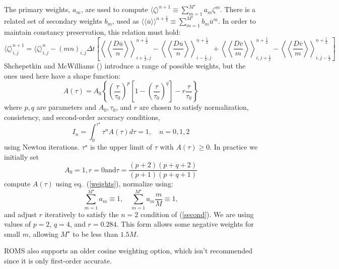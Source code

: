 The primary weights, $a_m$, are used to compute $\langle \zeta
\rangle^{n+1} \equiv \sum_{m=1}^{M^\star} a_m \zeta^m$. There is a
related set of secondary weights $b_m$, used as $\langle \! \langle
\overline{u} \rangle \! \rangle^{n+\frac{1}{2}} \equiv \sum_{m=1}^{M^\star} b_m
\overline{u}^m$. In order to maintain constancy preservation, this
relation must hold:
\begin{equation}
  \langle \zeta \rangle_{i,j}^{n+1} = \langle \zeta \rangle_{i,j}^n -
  (mn)_{i,j} \Delta t \left[ \left\langle \!\! \left\langle
  \frac{D\overline u}{n} \right\rangle \!\!
  \right\rangle_{i+\frac{1}{2},j}^{n+\frac{1}{2}}
  - \left\langle \!\! \left\langle \frac{D\overline u}{n} \right\rangle
  \!\! \right\rangle_{i-\frac{1}{2},j}^{n+\frac{1}{2}} +
  \left\langle \!\! \left\langle
  \frac{D\overline v}{m} \right\rangle \!\!
  \right\rangle_{i,j+\frac{1}{2}}^{n+\frac{1}{2}}
  - \left\langle \!\! \left\langle \frac{D\overline v}{m} \right\rangle
  \!\! \right\rangle_{i,j-\frac{1}{2}}^{n+\frac{1}{2}} \right]
\label{zeta3}
\end{equation}
Shchepetkin and McWilliams (\cite{SS2005}) introduce a range of
possible weights, but the ones used here have a shape function:
\begin{equation}
   A(\tau) = A_0 \left\{ \left( \frac{\tau}{\tau_0} \right)^p \left[ 1-
   \left(\frac{\tau}{\tau_0} \right)^q \right] - r \frac{\tau}{\tau_0}
   \right\}
\label{weights}
\end{equation}
where $p, q$ are parameters and $A_0, \tau_0$, and $r$ are chosen to
satisfy normalization, consistency, and second-order accuracy
conditions,
\begin{equation}
   I_n = \int_0^{\tau^\star} \tau^n A(\tau) d \tau = 1, \quad n=0,1,2
\label{second}
\end{equation}
using Newton iterations. $\tau^\star$ is the upper limit of $\tau$
with $A(\tau) \geq 0$. In practice we initially set
$$
  A_0 = 1, r = 0 \mbox{and} \tau = \frac{(p+2)(p+q+2)}{(p+1)(p+q+1)}
$$
compute $A(\tau)$ using eq.~(\ref{weights}), normalize using:
\begin{equation}
   \sum_{m=1}^{M^\star} a_m \equiv 1, \quad
   \sum_{m=1}^{M^\star} a_m\frac{m}{M} \equiv 1,
\end{equation}
and adjust $r$ iteratively to satisfy the $n=2$ condition of
(\ref{second}). We are using values of $p=2$, $q=4$, and $r=0.284$.
This form allows some negative weights for small $m$, allowing
$M^\star$ to be less than $1.5M$.

ROMS also supports an older cosine weighting option, which isn't
recommended since it is only first-order accurate.

